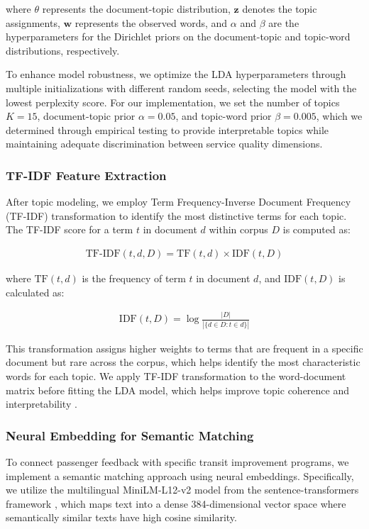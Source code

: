 \documentclass[a4paper,fleqn,12pt]{cas-sc}
\begin{document}
where $\theta$ represents the document-topic distribution, $\mathbf{z}$ denotes the topic assignments, $\mathbf{w}$ represents the observed words, and $\alpha$ and $\beta$ are the hyperparameters for the Dirichlet priors on the document-topic and topic-word distributions, respectively.

To enhance model robustness, we optimize the LDA hyperparameters through multiple initializations with different random seeds, selecting the model with the lowest perplexity score. For our implementation, we set the number of topics $K = 15$, document-topic prior $\alpha = 0.05$, and topic-word prior $\beta = 0.005$, which we determined through empirical testing to provide interpretable topics while maintaining adequate discrimination between service quality dimensions.

\subsubsection{TF-IDF Feature Extraction}

After topic modeling, we employ Term Frequency-Inverse Document Frequency (TF-IDF) transformation to identify the most distinctive terms for each topic. The TF-IDF score for a term $t$ in document $d$ within corpus $D$ is computed as:

\begin{align}
\text{TF-IDF}(t, d, D) = \text{TF}(t, d) \times \text{IDF}(t, D)
\end{align}

where $\text{TF}(t, d)$ is the frequency of term $t$ in document $d$, and $\text{IDF}(t, D)$ is calculated as:

\begin{align}
\text{IDF}(t, D) = \log\frac{|D|}{|\{d \in D: t \in d\}|}
\end{align}

This transformation assigns higher weights to terms that are frequent in a specific document but rare across the corpus, which helps identify the most characteristic words for each topic. We apply TF-IDF transformation to the word-document matrix before fitting the LDA model, which helps improve topic coherence and interpretability \citep{ming2014understanding}.

\subsubsection{Neural Embedding for Semantic Matching}

To connect passenger feedback with specific transit improvement programs, we implement a semantic matching approach using neural embeddings. Specifically, we utilize the multilingual MiniLM-L12-v2 model from the sentence-transformers framework \citep{reimers2019sentence}, which maps text into a dense 384-dimensional vector space where semantically similar texts have high cosine similarity.
\end{document}
